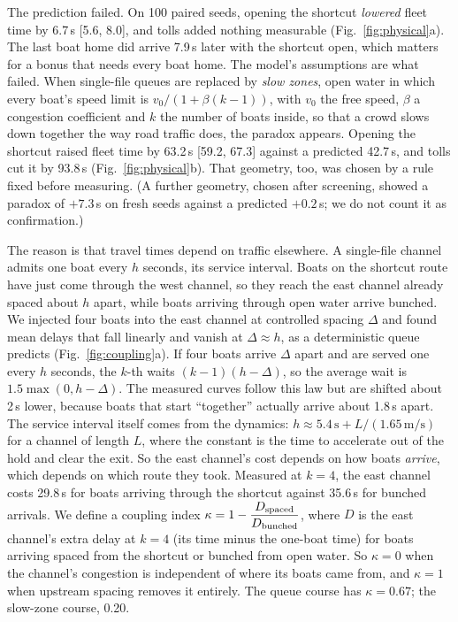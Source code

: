 \documentclass[11pt]{article}
\theoremstyle{definition}
\begin{document}
The prediction failed. On 100 paired seeds, opening the shortcut \emph{lowered} fleet time by 6.7\,s [5.6, 8.0], and tolls added nothing measurable (Fig.~\ref{fig:physical}a). The last boat home did arrive 7.9\,s later with the shortcut open, which matters for a bonus that needs every boat home. The model's assumptions are what failed. When single-file queues are replaced by \emph{slow zones}, open water in which every boat's speed limit is $v_0/(1+\beta(k-1))$, with $v_0$ the free speed, $\beta$ a congestion coefficient and $k$ the number of boats inside, so that a crowd slows down together the way road traffic does, the paradox appears. Opening the shortcut raised fleet time by 63.2\,s [59.2, 67.3] against a predicted 42.7\,s, and tolls cut it by 93.8\,s (Fig.~\ref{fig:physical}b). That geometry, too, was chosen by a rule fixed before measuring. (A further geometry, chosen after screening, showed a paradox of $+7.3$\,s on fresh seeds against a predicted $+0.2$\,s; we do not count it as confirmation.)

The reason is that travel times depend on traffic elsewhere. A single-file channel admits one boat every $h$ seconds, its service interval. Boats on the shortcut route have just come through the west channel, so they reach the east channel already spaced about $h$ apart, while boats arriving through open water arrive bunched. We injected four boats into the east channel at controlled spacing $\Delta$ and found mean delays that fall linearly and vanish at $\Delta\approx h$, as a deterministic queue predicts (Fig.~\ref{fig:coupling}a). If four boats arrive $\Delta$ apart and are served one every $h$ seconds, the $k$-th waits $(k-1)(h-\Delta)$, so the average wait is $1.5\max(0,h-\Delta)$. The measured curves follow this law but are shifted about 2\,s lower, because boats that start ``together'' actually arrive about 1.8\,s apart. The service interval itself comes from the dynamics: $h\approx5.4\,\mathrm s+L/(1.65\,\mathrm{m/s})$ for a channel of length $L$, where the constant is the time to accelerate out of the hold and clear the exit. So the east channel's cost depends on how boats \emph{arrive}, which depends on which route they took. Measured at $k=4$, the east channel costs 29.8\,s for boats arriving through the shortcut against 35.6\,s for bunched arrivals. We define a coupling index $\kappa=1-\dfrac{D_{\rm spaced}}{D_{\rm bunched}}$, where $D$ is the east channel's extra delay at $k=4$ (its time minus the one-boat time) for boats arriving spaced from the shortcut or bunched from open water. So $\kappa=0$ when the channel's congestion is independent of where its boats came from, and $\kappa=1$ when upstream spacing removes it entirely. The queue course has $\kappa=0.67$; the slow-zone course, 0.20.
\end{document}

